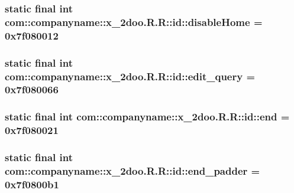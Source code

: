 \hypertarget{classcom_1_1companyname_1_1x__2doo_1_1_r_1_1id_ed8a4b988b696411dcff2333f44a0df8}{
\subsubsection[{disableHome}]{\setlength{\rightskip}{0pt plus 5cm}static final int com::companyname::x\_\-2doo.R.R::id::disableHome = 0x7f080012}}
\label{classcom_1_1companyname_1_1x__2doo_1_1_r_1_1id_ed8a4b988b696411dcff2333f44a0df8}


\hypertarget{classcom_1_1companyname_1_1x__2doo_1_1_r_1_1id_b85f1417e0c64f6ebd433bea82cec6a5}{
\subsubsection[{edit\_\-query}]{\setlength{\rightskip}{0pt plus 5cm}static final int com::companyname::x\_\-2doo.R.R::id::edit\_\-query = 0x7f080066}}
\label{classcom_1_1companyname_1_1x__2doo_1_1_r_1_1id_b85f1417e0c64f6ebd433bea82cec6a5}


\hypertarget{classcom_1_1companyname_1_1x__2doo_1_1_r_1_1id_eead1fe574d4500fe87130f4c0951ed9}{
\subsubsection[{end}]{\setlength{\rightskip}{0pt plus 5cm}static final int com::companyname::x\_\-2doo.R.R::id::end = 0x7f080021}}
\label{classcom_1_1companyname_1_1x__2doo_1_1_r_1_1id_eead1fe574d4500fe87130f4c0951ed9}


\hypertarget{classcom_1_1companyname_1_1x__2doo_1_1_r_1_1id_7d85517544bd96455bec13f15217a585}{
\subsubsection[{end\_\-padder}]{\setlength{\rightskip}{0pt plus 5cm}static final int com::companyname::x\_\-2doo.R.R::id::end\_\-padder = 0x7f0800b1}}
\label{classcom_1_1companyname_1_1x__2doo_1_1_r_1_1id_7d85517544bd96455bec13f15217a585}


